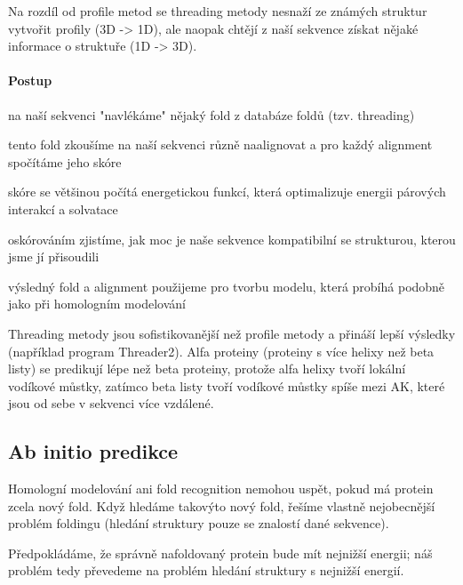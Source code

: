 \documentclass[DIV=8]{scrreprt}
\begin{document}
Na rozdíl od profile metod se threading metody nesnaží ze známých struktur vytvořit profily (3D -> 1D), ale naopak chtějí z naší sekvence získat nějaké informace o struktuře (1D -> 3D).

\paragraph{Postup}
\begin{myEnumerate}[nosep]
    \item na naší sekvenci "navlékáme" nějaký fold z databáze foldů (tzv. threading)
    \item tento fold zkoušíme na naší sekvenci různě naalignovat a pro každý alignment spočítáme jeho skóre
\begin{myItemize}[nosep]
    \item skóre se většinou počítá energetickou funkcí, která optimalizuje energii párových interakcí a solvatace
    \item oskórováním zjistíme, jak moc je naše sekvence kompatibilní se strukturou, kterou jsme jí přisoudili
\end{myItemize}

    \item výsledný fold a alignment použijeme pro tvorbu modelu, která probíhá podobně jako při homologním modelování
\end{myEnumerate}



Threading metody jsou sofistikovanější než profile metody a přináší lepší výsledky (například program Threader2). Alfa proteiny (proteiny s více helixy než beta listy) se predikují lépe než beta proteiny, protože alfa helixy tvoří lokální vodíkové můstky, zatímco beta listy tvoří vodíkové můstky spíše mezi AK, které jsou od sebe v sekvenci více vzdálené.

\subsection{Ab initio predikce} \label{Ab initio predikce}


Homologní modelování ani fold recognition nemohou uspět, pokud má protein zcela nový fold. Když hledáme takovýto nový fold, řešíme vlastně nejobecnější problém foldingu (hledání struktury pouze se znalostí dané sekvence).

Předpokládáme, že správně nafoldovaný protein bude mít nejnižší energii; náš problém tedy převedeme na problém hledání struktury s nejnižší energií.
\end{document}
